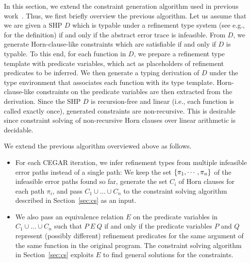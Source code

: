 In this section, we extend the constraint generation algorithm used in 
previous work~\cite{Unno2009,Terauchi2010,KobayashiPLDI2011}.  Thus, we 
first briefly overview the previous algorithm.  Let us assume that we 
are given a SHP \(D\) which is typable under a refinement type system 
(see e.g., \cite{Unno2009} for the definition) if and only if the 
abstract error trace is infeasible.  From \(D\), we generate 
Horn-clause-like constraints which are satisfiable if and only if \(D\) 
is typable.  To this end, for each function in \(D\), we prepare a 
refinement type template with predicate variables, which act as 
placeholders of refinement predicates to be inferred.  We then generate 
a typing derivation of \(D\) under the type environment that associates 
each function with its type template.  Horn-clause-like constraints on 
the predicate variables are then extracted from the derivation.  Since 
the SHP \(D\) is recursion-free and linear (i.e., each function is 
called exactly once), generated constraints are non-recursive.  This is 
desirable since constraint solving of non-recursive Horn clauses over 
linear arithmetic is decidable. 

We extend the previous algorithm overviewed above as follows.
\begin{itemize}
\item For each CEGAR iteration, we infer refinement types from multiple 
infeasible error paths instead of a single path:  We keep the set 
\(\{{\pi_1,\cdots,\pi_n}\}\) of the infeasible error paths found so far, 
generate the set \(C_i\) of Horn clauses for each path \(\pi_i\), and 
pass \(C_1 \cup \dots \cup C_n\) to the constraint solving algorithm 
described in Section~\ref{sec:cs} as an input.
\item We also pass an equivalence relation \(E\) on the predicate 
variables in \(C_1 \cup \dots \cup C_n\) such that \(P\ E\ Q\) if and 
only if the predicate variables \(P\) and \(Q\) represent (possibly 
different) refinement predicates for the same argument of the same 
function in the original program.    The constraint 
solving algorithm in Section~\ref{sec:cs} exploits \(E\) to find general 
solutions for the constraints.
\end{itemize}



